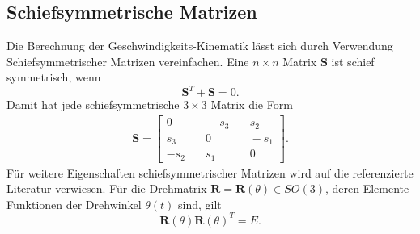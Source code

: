 \subsection{Schiefsymmetrische Matrizen}
Die Berechnung der Geschwindigkeits-Kinematik l{\"a}sst sich durch Verwendung Schiefsymmetrischer Matrizen vereinfachen. Eine $n\times n$ Matrix $\bm{S}$ ist schief symmetrisch, wenn 
\begin{equation}
	\label{eqn:skewsymmetric}
	\bm{S}^T+\bm{S}=0.
\end{equation}
Damit hat jede schiefsymmetrische $3\times3$ Matrix die Form
\begin{align}
	\bm{S} = \left[\begin{matrix}
		0 &\quad -s_3 &\quad s_2  \\
		s_3 &\quad 0 &\quad -s_1  \\
		-s_2 &\quad s_1 &\quad 0  
	\end{matrix}\right].
\end{align}
Für weitere Eigenschaften schiefsymmetrischer Matrizen wird auf die referenzierte Literatur \cite[S.~104]{Spong.2020} verwiesen. Für die Drehmatrix $\bm{R} = \bm{R}(\theta) \in SO(3)$, deren Elemente Funktionen der Drehwinkel $\theta\left(t\right)$ sind, gilt 
\begin{equation}
	\label{eqn:einheitsmatrix}
	\bm{R}(\theta)\bm{R}(\theta)^T = E.
\end{equation}
%
